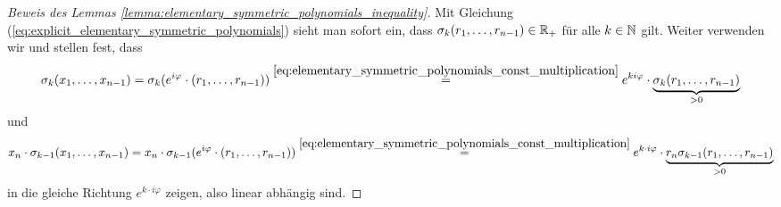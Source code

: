 \begin{proof}[Beweis des Lemmas \ref{lemma:elementary_symmetric_polynomials_inequality}]
    \noindent Mit Gleichung
    (\ref{eq:explicit_elementary_symmetric_polynomials})
    sieht man sofort ein, dass
    $\sigma_k(r_1, \dots, r_{n-1}) \in \mathbb{R}_{+}$ für alle $k \in \mathbb{N}$ gilt.
    Weiter verwenden wir
    und stellen fest, dass
    \begin{equation*}
        \sigma_{k}(x_1, \dots, x_{n-1})
        = \sigma_k(e^{i \varphi} \cdot (r_1, \dots, r_{n-1}))
        \overset{\eqref{eq:elementary_symmetric_polynomials_const_multiplication}}{=}
            e^{k i \varphi} \cdot \underbrace{\sigma_k(r_1, \dots, r_{n-1})}_{> 0}
    \end{equation*}
    und
    \begin{equation*}
        x_n \cdot \sigma_{k-1}(x_1, \dots, x_{n-1})
        = x_n \cdot \sigma_{k-1}(e^{i \varphi} \cdot (r_1, \dots, r_{n-1}))
        \overset{\eqref{eq:elementary_symmetric_polynomials_const_multiplication}}{=}
            e^{k \cdot i \varphi} \cdot \underbrace{r_n \sigma_{k-1}(r_1, \dots, r_{n-1})}_{> 0}
    \end{equation*}
    \enlargethispage{2em}
    in die gleiche Richtung $e^{k \cdot i\varphi}$ zeigen, also linear abhängig
    sind.
\end{proof}
